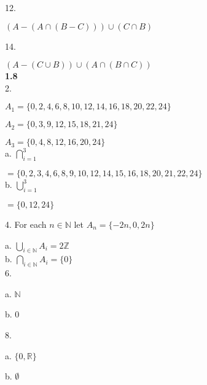 \documentclass[12pt]{article}
\def\R{\mathbb R}							%
\def\Z{\mathbb Z}
\def\N{\mathbb N}
\begin{document}
12.

$(A-(A\cap (B-C)))\cup (C\cap B)$

14.

$(A-(C\cup B))\cup (A\cap (B\cap C))$\\

{\bf 1.8}\\

2.

$A_1 = \{0,2,4,6,8,10,12,14,16,18,20,22,24\}$

$A_2 = \{0,3,9,12,15,18,21,24\}$

$A_3 = \{0,4,8,12,16,20,24\}$\\

a. $\bigcap_{i=1}^{3}$

$= \{0,2,3,4,6,8,9,10,12,14,15,16,18,20,21,22,24\}$\\

b. $\bigcup_{i=1}^{3}$

$= \{0,12,24\}$

4. For each $n\in \N$ let $A_n = \{-2n,0,2n\}$

a. $\bigcup_{i\in \N}A_{i}= 2\Z$\\

b. $\bigcap _{i\in \N}A_{i} = \{0\}$\\

6.

a. $\N$

b. 0

8.

a. $\{0,\R\}$

b. $\emptyset$
\end{document}
